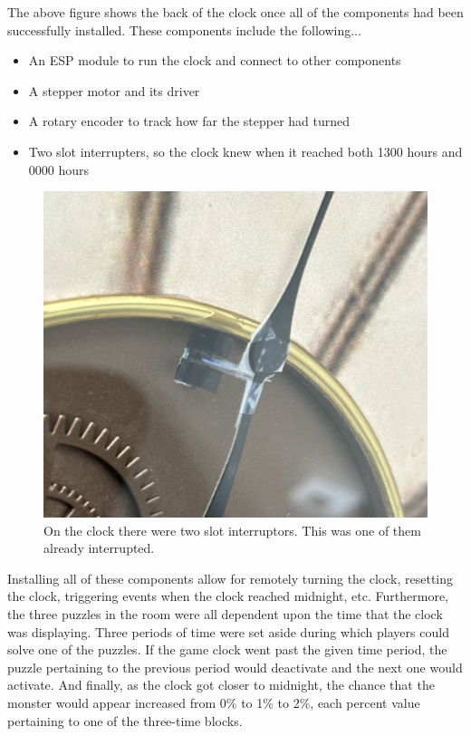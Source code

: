\documentclass[conference]{IEEEtran}
\begin{document}
\indent The above figure shows the back of the clock once all of the components had been successfully installed. These components include the following...
\begin{itemize}
    \item An ESP module to run the clock and connect to other components
    \item A stepper motor and its driver
    \item A rotary encoder to track how far the stepper had turned
    \item Two slot interrupters, so the clock knew when it reached both 1300 hours and 0000 hours
\end{itemize}
\begin{figure}[ht]
    \centering
    \includegraphics[width=0.90\columnwidth]{Images/slot_interruptor_interrupted.jpg}
    \caption{On the clock there were two slot interruptors. This was one of them already interrupted.}
    \label{fig:slotInterruptor}
\end{figure}

\indent Installing all of these components allow for remotely turning the clock, resetting the clock, triggering events
when the clock reached midnight, etc. Furthermore, the three puzzles in the room were all dependent upon the time that the clock was displaying.
Three periods of time were set aside during which players could solve one of the puzzles. If the game clock went past the given time period, the
puzzle pertaining to the previous period would deactivate and the next one would activate. And finally, as the clock got closer to midnight,
the chance that the monster would appear increased from 0\% to 1\% to 2\%, each percent value pertaining to one of the three-time blocks. 
\end{document}

